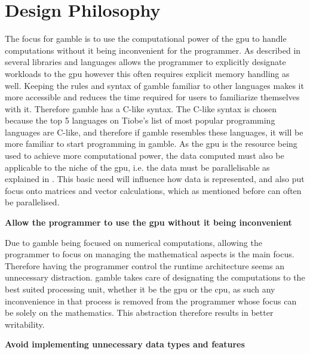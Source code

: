 \section{Design Philosophy}\label{sec:phil}

The focus for \gls{gamble} is to use the computational power of the \acrshort{gpu} to handle computations without it being inconvenient for the programmer.
As described in  several libraries and languages allows the programmer to explicitly designate workloads to the \acrshort{gpu} however this often requires explicit memory handling as well.
Keeping the rules and syntax of \gls{gamble} familiar to other languages makes it more accessible and reduces the time required for users to familiarize themselves with it.
Therefore \gls{gamble} has a C-like syntax.
The C-like syntax is chosen because the top 5 languages on Tiobe's list of most popular programming languages are C-like, and therefore if \gls{gamble} resembles these languages, it will be more familiar to start programming in \gls{gamble}.\citep{TIOBE}
As the \acrshort{gpu} is the resource being used to achieve more computational power, the data computed must also be applicable to the niche of the \acrshort{gpu}, i.e. the data must be parallelisable as explained in .
This basic need will influence how data is represented, and also put focus onto matrices and vector calculations, which as mentioned before can often be parallelised.

\textbf{Allow the programmer to use the \acrshort{gpu} without it being inconvenient}

Due to \gls{gamble} being focused on numerical computations, allowing the programmer to focus on managing the mathematical aspects is the main focus.
Therefore having the programmer control the runtime architecture seems an unnecessary distraction.
\gls{gamble} takes care of designating the computations to the best suited processing unit, whether it be the \acrshort{gpu} or the \acrshort{cpu}, as such any inconvenience in that process is removed from the programmer whose focus can be solely on the mathematics.
This abstraction therefore results in better writability.


\textbf{Avoid implementing unnecessary data types and features}

